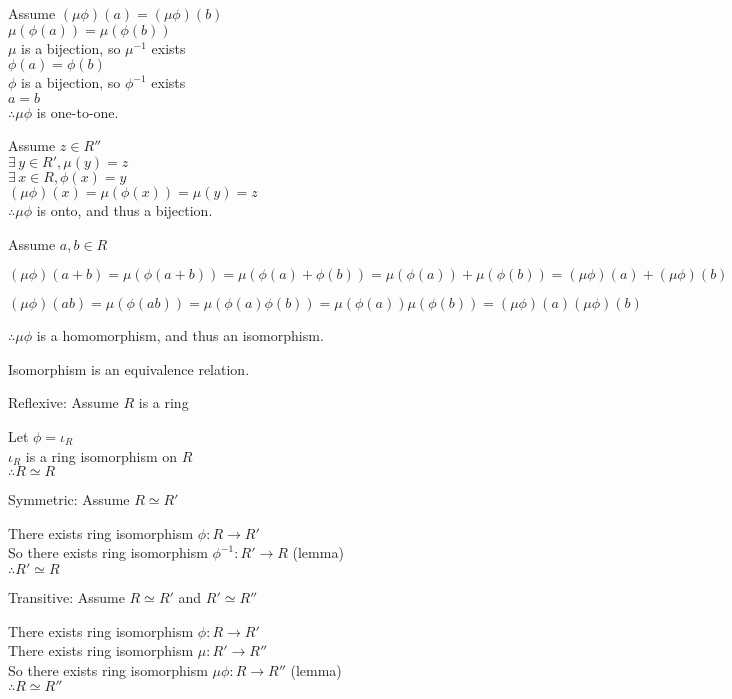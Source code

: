 \documentclass[letterpaper,12pt,fleqn]{article}
\begin{document}
\begin{theproof}
  Assume $(\mu\phi)(a)=(\mu\phi)(b)$ \\
  $\mu(\phi(a))=\mu(\phi(b))$ \\
  $\mu$ is a bijection, so $\mu^{-1}$ exists \\
  $\phi(a)=\phi(b)$ \\
  $\phi$ is a bijection, so $\phi^{-1}$ exists \\
  $a=b$ \\
  $\therefore \mu\phi$ is one-to-one.

  Assume $z\in R''$ \\
  $\exists\,y\in R',\mu(y)=z$ \\
  $\exists\,x\in R,\phi(x)=y$ \\
  $(\mu\phi)(x)=\mu(\phi(x))=\mu(y)=z$ \\
  $\therefore \mu\phi$ is onto, and thus a bijection.

  Assume $a,b\in R$

  $(\mu\phi)(a+b)=\mu(\phi(a+b))=\mu(\phi(a)+\phi(b))=\mu(\phi(a))+\mu(\phi(b))=
  (\mu\phi)(a)+(\mu\phi)(b)$

  $(\mu\phi)(ab)=\mu(\phi(ab))=\mu(\phi(a)\phi(b))=\mu(\phi(a))\mu(\phi(b))=
  (\mu\phi)(a)(\mu\phi)(b)$

  $\therefore \mu\phi$ is a homomorphism, and thus an isomorphism.
\end{theproof}

\begin{theorem}
  Isomorphism is an equivalence relation.
\end{theorem}

\begin{theproof}
  \listbreak
  \begin{description}
  \item Reflexive: Assume $R$ is a ring

    Let $\phi=\iota_R$ \\
    $\iota_R$ is a ring isomorphism on $R$ \\
    $\therefore R\simeq R$

  \item Symmetric: Assume $R\simeq R'$

    There exists ring isomorphism $\phi:R\to R'$ \\
    So there exists ring isomorphism $\phi^{-1}:R'\to R$ (lemma) \\
    $\therefore R'\simeq R$

  \item Transitive: Assume $R\simeq R'$ and $R'\simeq R''$

    There exists ring isomorphism $\phi:R\to R'$ \\
    There exists ring isomorphism $\mu:R'\to R''$ \\
    So there exists ring isomorphism $\mu\phi:R\to R''$ (lemma) \\
    $\therefore R\simeq R''$
  \end{description}
\end{theproof}
\end{document}
